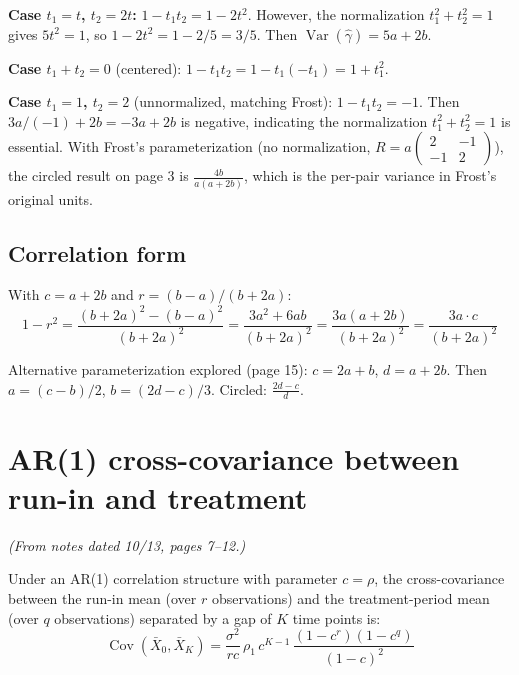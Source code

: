 \documentclass[11pt]{article}
\DeclareMathOperator{\Var}{Var}
\DeclareMathOperator{\Cov}{Cov}
\begin{document}
\textbf{Case $t_1 = t$, $t_2 = 2t$:}
$1 - t_1 t_2 = 1 - 2t^2$. However, the normalization
$t_1^2 + t_2^2 = 1$ gives $5t^2 = 1$, so
$1 - 2t^2 = 1 - 2/5 = 3/5$. Then
$\Var(\hat\gamma) = 5a + 2b$.

\textbf{Case $t_1 + t_2 = 0$} (centered):
$1 - t_1 t_2 = 1 - t_1(-t_1) = 1 + t_1^2$.

\textbf{Case $t_1 = 1$, $t_2 = 2$} (unnormalized,
matching Frost):
$1 - t_1 t_2 = -1$. Then $3a/(-1) + 2b = -3a + 2b$
is negative, indicating the normalization $t_1^2+t_2^2=1$
is essential. With Frost's parameterization (no normalization,
$R = a\begin{pmatrix}2&-1\\-1&2\end{pmatrix}$), the
circled result on page 3 is
$\frac{4b}{a(a+2b)}$, which is the per-pair variance
in Frost's original units.


\subsection{Correlation form}

With $c = a + 2b$ and $r = (b - a)/(b + 2a)$:
\begin{equation}
  1 - r^2 = \frac{(b+2a)^2 - (b-a)^2}{(b+2a)^2}
  = \frac{3a^2 + 6ab}{(b+2a)^2}
  = \frac{3a(a + 2b)}{(b+2a)^2}
  = \frac{3a \cdot c}{(b+2a)^2}
\end{equation}

Alternative parameterization explored (page 15):
$c = 2a + b$, $d = a + 2b$. Then
$a = (c - b)/2$, $b = (2d - c)/3$.
Circled: $\frac{2d - c}{d}$.


\section{AR(1) cross-covariance between run-in and treatment}
\label{sec:ar1_cross}

\noindent
\textit{(From notes dated 10/13, pages 7--12.)}

\medskip
\noindent
Under an AR(1) correlation structure with parameter
$c = \rho$, the cross-covariance between the run-in mean
(over $r$ observations) and the treatment-period mean
(over $q$ observations) separated by a gap of $K$ time
points is:
\begin{equation}
  \Cov(\bar{X}_0, \bar{X}_K)
  = \frac{\sigma^2}{rc}\,\rho_1\, c^{K-1}\,
    \frac{(1 - c^r)(1 - c^q)}{(1 - c)^2}
  \label{eq:cov_ar1}
\end{equation}
\end{document}
